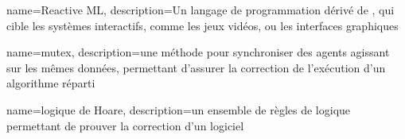 {
	name={Reactive ML},
	description={Un langage de programmation dérivé de , qui cible les systèmes interactifs, comme les jeux vidéos, ou les interfaces graphiques}	
}

{
	name=mutex,
	description={une méthode pour synchroniser des agents agissant sur les mêmes données, permettant d'assurer la correction de l'exécution d'un algorithme réparti}	
}

{
	name={logique de Hoare},
	description={un ensemble de règles de logique permettant de prouver la correction d'un logiciel}
}
